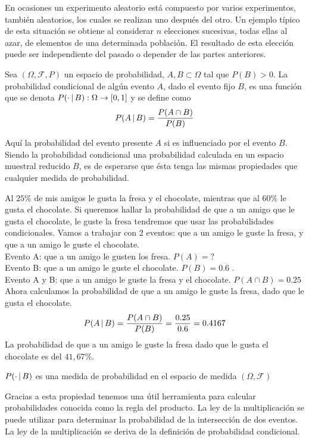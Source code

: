 En ocasiones un experimento aleatorio está compuesto por varios experimentos, también aleatorios, los cuales se realizan uno después del otro. Un ejemplo típico de esta situación se obtiene al considerar $n$ elecciones sucesivas, todas ellas al azar, de elementos de una determinada población. El resultado de esta elección puede ser independiente del pasado o depender de las partes anteriores.
\begin{Def}
    Sea $(\Omega,\mathscr{F},P)$ un espacio de probabilidad, $A,B\subset\Omega$ tal que $P(B)>0$. La probabilidad condicional de algún evento $A$, dado el evento fijo $B$, es una función que se denota $P(\cdot\thinspace|\thinspace B):\Omega\rightarrow [0,1]$ y se define como $$P(A\thinspace|\thinspace B)=\frac{P(A\cap B)}{P(B)}$$
\end{Def}
    Aquí la probabilidad del evento presente $A$ si es influenciado por el evento $B$.\\
    Siendo la probabilidad condicional una probabilidad calculada en un espacio muestral reducido $B$, es de esperarse que ésta tenga las mismas propiedades que cualquier medida de probabilidad.
\begin{Ejm}
    Al $25 \%$ de mis amigos le gusta la fresa y el chocolate, mientras que al $60\%$ le gusta el chocolate. Si queremos hallar la probabilidad de que a un amigo que le gusta el chocolate, le guste la fresa tendremos que usar las probabilidades condicionales.
    Vamos a trabajar con 2 eventos: que a un amigo le guste la fresa, y que a un amigo le guste el chocolate.\\
    Evento A: que a un amigo le gusten los fresa. $P(A) = ?$\\
    Evento B: que a un amigo le guste el chocolate. $P(B) =0.6$ .\\
    Evento A y B: que a un amigo le guste la fresa y el chocolate. $P(A\cap B) =0.25$\\
    Ahora calculamos la probabilidad de que a un amigo le guste la fresa, dado que le gusta el chocolate.
    $$P(A\thinspace|\thinspace B)=\frac{P(A\cap B)}{P(B)}=\frac{0.25}{0.6}=0.4167$$
    La probabilidad de que a un amigo le guste la fresa dado que le gusta el chocolate es del $41,67\%$.
\end{Ejm}
\begin{Prop}
    $P(\cdot\thinspace|\thinspace B)$ es una medida de probabilidad en el espacio de medida $(\Omega,\mathscr{F})$
\end{Prop}
Gracias a esta propiedad tenemos una útil herramienta para calcular probabilidades conocida como la regla del producto. La ley de la multiplicación se puede utilizar para determinar la probabilidad de la intersección de dos eventos. La ley de la multiplicación se deriva de la definición de probabilidad condicional.
